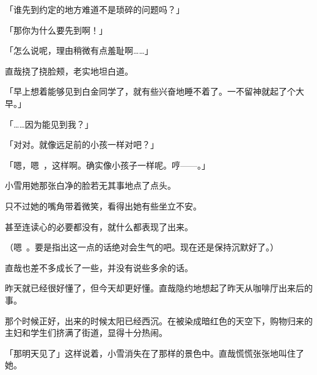 「谁先到约定的地方难道不是琐碎的问题吗？」

「那你为什么要先到啊！」

「怎么说呢，理由稍微有点羞耻啊……」

直哉挠了挠脸颊，老实地坦白道。

「早上想着能够见到白金同学了，就有些兴奋地睡不着了。一不留神就起了个大早。」

「……因为能见到我？」

「对对。就像远足前的小孩一样对吧？」

「嗯，嗯~，这样啊。确实像小孩子一样呢。哼——。」

小雪用她那张白净的脸若无其事地点了点头。

只不过她的嘴角带着微笑，看得出她有些坐立不安。

甚至连读心的必要都没有，就什么都表现了出来。

（嗯~。要是指出这一点的话绝对会生气的吧。现在还是保持沉默好了。）

直哉也差不多成长了一些，并没有说些多余的话。

昨天就已经很好懂了，但今天却更好懂。直哉隐约地想起了昨天从咖啡厅出来后的事。

那个时候正好，出来的时候太阳已经西沉。在被染成暗红色的天空下，购物归来的主妇和学生们挤满了街道，显得十分热闹。

「那明天见了」这样说着，小雪消失在了那样的景色中。直哉慌慌张张地叫住了她。


